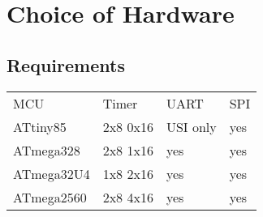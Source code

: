 \setchapterpreamble[u]{\margintoc}

\chapter{Choice of Hardware}


\section{Requirements}

\begin{tabular}{llll}
    MCU & Timer & UART & SPI \\
    ATtiny85 & 2x8 0x16 & USI only & yes \\
    ATmega328 & 2x8 1x16 & yes & yes \\
    ATmega32U4 & 1x8 2x16 & yes & yes \\
    ATmega2560 & 2x8 4x16 & yes & yes \\
\end{tabular}
